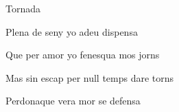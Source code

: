 \documentclass[12pt]{article}
\begin{document}
\begin{estrofaExtra}%




\begin{tornada}

\textsection{}Tornada

\end{tornada}


\end{estrofaExtra}


\begin{estrofa}

 Plena de seny yo adeu dispensa

 Que per amor yo fenesqua mos jorns

 Mas sin escap per null temps dare torns

 Perdonaque vera mor se defensa

\end{estrofa}
\end{document}
